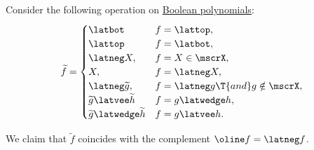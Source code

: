\begin{proposition}\label{thm:boolean_polynomial_complement}
  Consider the following operation on \hyperref[def:free_boolean_algebra/polynomial]{Boolean polynomials}:
  \begin{equation}\label{eq:thm:boolean_polynomial_complement}
    \widetilde f = \begin{cases}
      \latbot                             &f = \lattop, \\
      \lattop                             &f = \latbot, \\
      \latneg X,                          &f = X \in \mscrX, \\
      X,                                  &f = \latneg X, \\
      \latneg \widetilde g,               &f = \latneg g \T{and} g \notin \mscrX, \\
      \widetilde g \latvee \widetilde h   &f = g \latwedge h, \\
      \widetilde g \latwedge \widetilde h &f = g \latvee h.
    \end{cases}
  \end{equation}

  We claim that \( \widetilde f \) coincides with the complement \( \oline f = \latneg f \).
\end{proposition}
